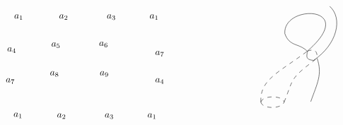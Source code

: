 \documentclass{article}
\begin{document}
\begin{example}
\[\begin{tikzpicture}[x=0.75pt,y=0.75pt,yscale=-1,xscale=1]
    \draw    (491.11,177.67) .. controls (525.11,154.67) and (533.11,117.67) .. (514.11,100.67) ;
    \draw    (450.11,139.67) .. controls (447.11,96.67) and (557.11,99.67) .. (482.11,164.67) ;
    \draw    (450.11,139.67) .. controls (457.11,158.67) and (470.11,152.67) .. (482.11,164.67) ;
    \draw    (487.11,236.44) .. controls (496.11,210.67) and (504.11,197.67) .. (496.11,174.67) ;
    \draw    (482.11,164.67) .. controls (482.11,170.67) and (478.11,176.67) .. (491.11,177.67) ;
    \draw  [dash pattern={on 4.5pt off 4.5pt}]  (482.11,164.67) .. controls (497.11,158.67) and (496.11,170.67) .. (496.11,174.67) ;
    \draw  [dash pattern={on 4.5pt off 4.5pt}]  (416,237.15) .. controls (417.89,247.1) and (445.4,247.44) .. (449.11,237.15) ;
    \draw  [dash pattern={on 4.5pt off 4.5pt}]  (416,237.15) .. controls (418.2,227) and (447.87,227.34) .. (449.11,237.15) ;
    \draw  [dash pattern={on 4.5pt off 4.5pt}]  (416,237.15) .. controls (414.11,204.67) and (442.11,194.67) .. (482.11,164.67) ;
    \draw  [dash pattern={on 4.5pt off 4.5pt}]  (449.11,237.15) .. controls (463.11,202.67) and (456.11,204.67) .. (496.11,174.67) ;
    
    \draw (63,110.96) node [anchor=north west][inner sep=0.75pt]    {$a_{1}$};
    \draw (127,110.96) node [anchor=north west][inner sep=0.75pt]    {$a_{2}$};
    \draw (195,110.96) node [anchor=north west][inner sep=0.75pt]    {$a_{3}$};
    \draw (256,110.96) node [anchor=north west][inner sep=0.75pt]    {$a_{1}$};
    \draw (62,250.96) node [anchor=north west][inner sep=0.75pt]    {$a_{1}$};
    \draw (53,157.96) node [anchor=north west][inner sep=0.75pt]    {$a_{4}$};
    \draw (116,150.96) node [anchor=north west][inner sep=0.75pt]    {$a_{5}$};
    \draw (184,149.96) node [anchor=north west][inner sep=0.75pt]    {$a_{6}$};
    \draw (264,201.96) node [anchor=north west][inner sep=0.75pt]    {$a_{4}$};
    \draw (51,201.96) node [anchor=north west][inner sep=0.75pt]    {$a_{7}$};
    \draw (114,191.96) node [anchor=north west][inner sep=0.75pt]    {$a_{8}$};
    \draw (124,251.96) node [anchor=north west][inner sep=0.75pt]    {$a_{2}$};
    \draw (192,251.96) node [anchor=north west][inner sep=0.75pt]    {$a_{3}$};
    \draw (253,251.96) node [anchor=north west][inner sep=0.75pt]    {$a_{1}$};
    \draw (185,191.96) node [anchor=north west][inner sep=0.75pt]    {$a_{9}$};
    \draw (264,162.96) node [anchor=north west][inner sep=0.75pt]    {$a_{7}$};
    \end{tikzpicture}\]
\end{example}
\end{document}
